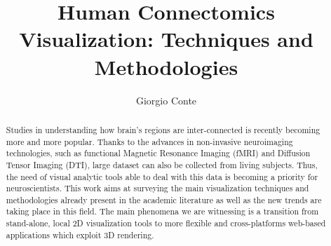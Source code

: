 \documentclass{article}
\title{Human Connectomics Visualization: Techniques and Methodologies}
\author{Giorgio Conte}
\affil{Creative Coding Research Group\\ Department of Computer Science\\University of Illinois at Chicago}
\begin{document}
\maketitle
\begin{abstract}
Studies in understanding how brain's regions are inter-connected is recently becoming more and more popular. Thanks to the advances in non-invasive neuroimaging technologies, such as functional Magnetic Resonance Imaging (fMRI) and Diffusion Tensor Imaging (DTI), large dataset can also be collected from living subjects. Thus, the need of visual analytic tools able to deal with this data is becoming a priority for neuroscientists. This work aims at surveying the main visualization techniques and methodologies already present in the academic literature as well as the new trends are taking place in this field. The main phenomena we are witnessing is a transition from stand-alone, local 2D visualization tools to more flexible and cross-platforms web-based applications which exploit 3D rendering.
\end{abstract}
\end{document}
